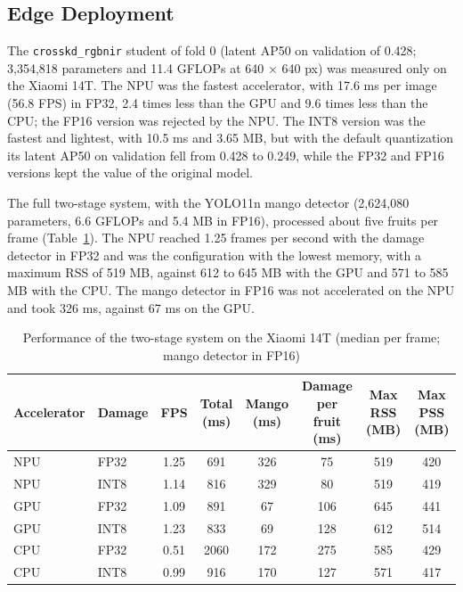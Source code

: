 \documentclass[journal]{IEEEtran}
\begin{document}
\subsection{Edge Deployment}\label{sec:res-edge}
The \texttt{crosskd\_\allowbreak rgbnir} student of fold 0 (latent AP50 on validation of 0.428; 3,354,818 parameters and 11.4 GFLOPs at 640 $\times$ 640 px) was measured only on the Xiaomi 14T. The NPU was the fastest accelerator, with 17.6 ms per image (56.8 FPS) in FP32, 2.4 times less than the GPU and 9.6 times less than the CPU; the FP16 version was rejected by the NPU. The INT8 version was the fastest and lightest, with 10.5 ms and 3.65 MB, but with the default quantization its latent AP50 on validation fell from 0.428 to 0.249, while the FP32 and FP16 versions kept the value of the original model.

The full two-stage system, with the YOLO11n mango detector (2,624,080 parameters, 6.6 GFLOPs and 5.4 MB in FP16), processed about five fruits per frame (Table~\ref{tab:system}). The NPU reached 1.25 frames per second with the damage detector in FP32 and was the configuration with the lowest memory, with a maximum RSS of 519 MB, against 612 to 645 MB with the GPU and 571 to 585 MB with the CPU. The mango detector in FP16 was not accelerated on the NPU and took 326 ms, against 67 ms on the GPU.

\begin{table}[!t]
\caption{Performance of the two-stage system on the Xiaomi 14T (median per frame; mango detector in FP16)}
\label{tab:system}
\centering
\footnotesize
\setlength{\tabcolsep}{6pt}
\renewcommand{\arraystretch}{1.1}
\begin{tabular}{@{}llcccccc@{}}
\toprule
Accelerator & Damage & FPS & Total (ms) & Mango (ms) & Damage per fruit (ms) & Max RSS (MB) & Max PSS (MB) \\
\midrule
NPU & FP32 & 1.25 & 691 & 326 & 75 & 519 & 420 \\
NPU & INT8 & 1.14 & 816 & 329 & 80 & 519 & 419 \\
GPU & FP32 & 1.09 & 891 & 67 & 106 & 645 & 441 \\
GPU & INT8 & 1.23 & 833 & 69 & 128 & 612 & 514 \\
CPU & FP32 & 0.51 & 2060 & 172 & 275 & 585 & 429 \\
CPU & INT8 & 0.99 & 916 & 170 & 127 & 571 & 417 \\
\bottomrule
\end{tabular}
\end{table}
\end{document}
